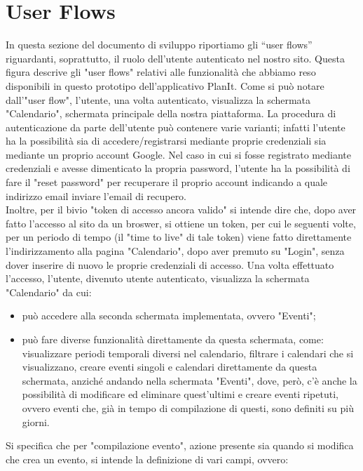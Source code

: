 \section{User Flows}
\label{secD4:UserFlows}

In questa sezione del documento di sviluppo riportiamo gli “user flows” riguardanti, soprattutto, il ruolo dell'utente autenticato nel nostro sito.
Questa figura descrive gli "user flows" relativi alle funzionalità che abbiamo reso disponibili in questo prototipo dell'applicativo PlanIt. Come si può notare dall'"user flow", l'utente, una volta autenticato, visualizza la schermata "Calendario", schermata principale della nostra piattaforma. La procedura di autenticazione da parte dell'utente può contenere varie varianti; infatti l'utente ha la possibilità sia di accedere/registrarsi mediante proprie credenziali sia mediante un proprio account Google. Nel caso in cui si fosse registrato mediante credenziali e avesse dimenticato la propria password, l'utente ha la possibilità di fare il "reset password" per recuperare il proprio account indicando a quale indirizzo email inviare l'email di recupero. \\ Inoltre, per il bivio "token di accesso ancora valido" si intende dire che, dopo aver fatto l'accesso al sito da un broswer, si ottiene un token, per cui le seguenti volte, per un periodo di tempo (il "time to live" di tale token) viene fatto direttamente l'indirizzamento alla pagina "Calendario", dopo aver premuto su "Login", senza dover inserire di nuovo le proprie credenziali di accesso.
Una volta effettuato l'accesso, l'utente, divenuto utente autenticato, visualizza la schermata "Calendario" da cui:
\begin{itemize}
    \item può accedere alla seconda schermata implementata, ovvero "Eventi";
    \item può fare diverse funzionalità direttamente da questa schermata, come: visualizzare periodi temporali diversi nel calendario, filtrare i calendari che si visualizzano, creare eventi singoli e calendari direttamente da questa schermata, anziché andando nella schermata "Eventi", dove, però, c'è anche la possibilità di modificare ed eliminare quest'ultimi e creare eventi ripetuti, ovvero eventi che, già in tempo di compilazione di questi, sono definiti su più giorni.
\end{itemize}
Si specifica che per "compilazione evento", azione presente sia quando si modifica che crea un evento, si intende la definizione di vari campi, ovvero:
